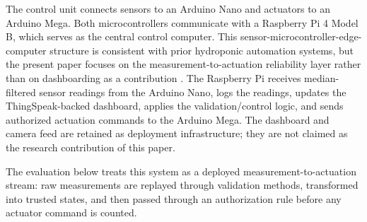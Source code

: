 \documentclass[preprint,12pt,doubleblind]{elsarticle}
\begin{document}
The control unit connects sensors to an Arduino Nano and actuators to an Arduino Mega. Both microcontrollers communicate with a Raspberry Pi 4 Model B, which serves as the central control computer. This sensor-microcontroller-edge-computer structure is consistent with prior hydroponic automation systems, but the present paper focuses on the measurement-to-actuation reliability layer rather than on dashboarding as a contribution \cite{tatas2022reliable,domingues2012automated}. The Raspberry Pi receives median-filtered sensor readings from the Arduino Nano, logs the readings, updates the ThingSpeak-backed dashboard, applies the validation/control logic, and sends authorized actuation commands to the Arduino Mega. The dashboard and camera feed are retained as deployment infrastructure; they are not claimed as the research contribution of this paper.

\begin{table}[!htbp]
\centering
\caption{Hydroponic platform components relevant to measurement validation and actuation. Water level is listed because it is part of the deployed system, but it is excluded from the primary quantitative analysis because the available raw values are not defensibly calibrated.}
\label{tab:system_components}
\end{table}

The evaluation below treats this system as a deployed measurement-to-actuation stream: raw measurements are replayed through validation methods, transformed into trusted states, and then passed through an authorization rule before any actuator command is counted.
\FloatBarrier
\end{document}
